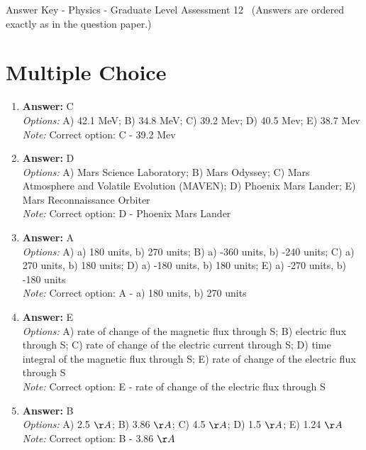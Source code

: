 \documentclass[12pt]{article}
\begin{document}
\begin{center}
Answer Key - Physics - Graduate Level Assessment 12 \
\small (Answers are ordered exactly as in the question paper.)
\end{center}

\section*{Multiple Choice}
\begin{enumerate}[label=\arabic*.]
\item \textbf{Answer:} C
\\ \textit{Options:} A) 42.1 MeV; B) 34.8 MeV; C) 39.2 Mev; D) 40.5 Mev; E) 38.7 Mev
\\ \textit{Note:} Correct option: C - 39.2 Mev
\item \textbf{Answer:} D
\\ \textit{Options:} A) Mars Science Laboratory; B) Mars Odyssey; C) Mars Atmosphere and Volatile Evolution (MAVEN); D) Phoenix Mars Lander; E) Mars Reconnaissance Orbiter
\\ \textit{Note:} Correct option: D - Phoenix Mars Lander
\item \textbf{Answer:} A
\\ \textit{Options:} A) a) 180 units, b) 270 units; B) a) -360 units, b) -240 units; C) a) 270 units, b) 180 units; D) a) -180 units, b) 180 units; E) a) -270 units, b) -180 units
\\ \textit{Note:} Correct option: A - a) 180 units, b) 270 units
\item \textbf{Answer:} E
\\ \textit{Options:} A) rate of change of the magnetic flux through S; B) electric flux through S; C) rate of change of the electric current through S; D) time integral of the magnetic flux through S; E) rate of change of the electric flux through S
\\ \textit{Note:} Correct option: E - rate of change of the electric flux through S
\item \textbf{Answer:} B
\\ \textit{Options:} A) 2.5 \ensuremath{\AA}; B) 3.86 \ensuremath{\AA}; C) 4.5 \ensuremath{\AA}; D) 1.5 \ensuremath{\AA}; E) 1.24 \ensuremath{\AA}
\\ \textit{Note:} Correct option: B - 3.86 \ensuremath{\AA}
\end{enumerate}
\end{document}
